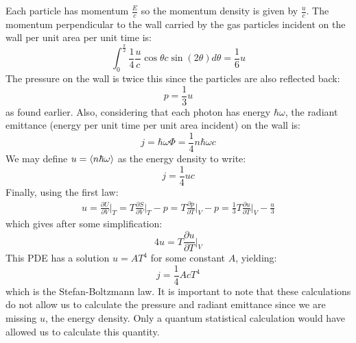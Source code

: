 \documentclass[a4paper,11pt,oneside]{book}
\begin{document}
Each particle has momentum $\frac{E}{c}$ so the momentum density is given by $\frac{u}{c}$. The momentum perpendicular to the wall carried by the gas particles incident on the wall per unit area per unit time is:
\begin{equation}
   \int_0^{\frac{\pi}{2}}\frac{1}{4}\frac{u}{c}\cos \theta c\sin(2\theta) d\theta = \frac{1}{6}u
\end{equation}
The pressure on the wall is twice this since the particles are also reflected back:
\begin{equation}
    p = \frac{1}{3}u
\end{equation}
as found earlier. Also, considering that each photon has energy $\hbar \omega$, the radiant emittance (energy per unit time per unit area incident) on the wall is:
\begin{equation}
    j = \hbar \omega \Phi = \frac{1}{4}n \hbar \omega c
\end{equation}
We may define $u=\braket{n \hbar \omega}$ as the energy density to write:
\begin{equation}
    j = \frac{1}{4}uc
\end{equation}
Finally, using the first law:
\begin{align}
    u = \frac{\partial U}{\partial V}\bigg|_T = T \frac{\partial S}{\partial V}\bigg|_T-p=T\frac{\partial p}{\partial T}\bigg|_V-p=\frac{1}{3}T\frac{\partial u}{\partial T}\bigg|_V-\frac{u}{3}
\end{align}
which gives after some simplification:
\begin{equation}
    4u=T\frac{\partial u}{\partial T}\bigg|_V
\end{equation}
This PDE has a solution $u=A T^4$ for some constant $A$, yielding:
\begin{equation}
    j = \frac{1}{4}Ac T^4
\end{equation}
which is the Stefan-Boltzmann law. It is important to note that these calculations do not allow us to calculate the pressure and radiant emittance since we are missing $u$, the energy density. Only a quantum statistical calculation would have allowed us to calculate this quantity.
\end{document}
